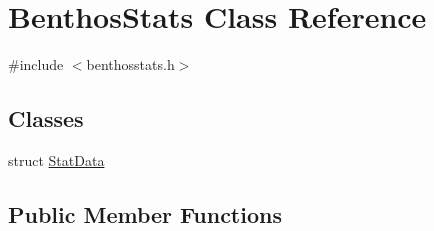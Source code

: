\hypertarget{class_benthos_stats}{}\section{Benthos\+Stats Class Reference}
\label{class_benthos_stats}


{\ttfamily \#include $<$benthosstats.\+h$>$}

\subsection*{Classes}
\begin{DoxyCompactItemize}
\item 
struct \mbox{\hyperlink{struct_benthos_stats_1_1_stat_data}{Stat\+Data}}
\end{DoxyCompactItemize}
\subsection*{Public Member Functions}
